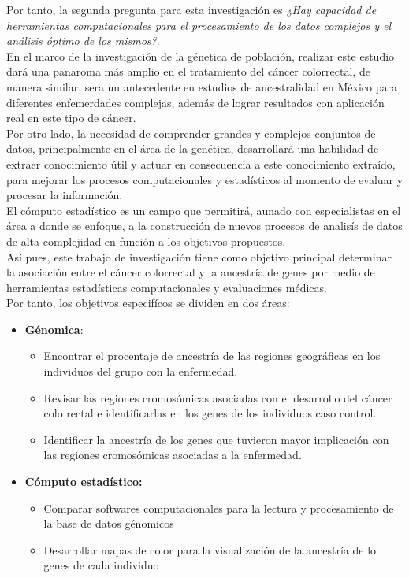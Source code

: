 
Por tanto, la segunda pregunta para esta investigación es \textit{¿Hay capacidad de herramientas computacionales para el procesamiento de los datos complejos y el análisis óptimo de los mismos?}.\\

En el marco de la investigación de la génetica de población, realizar este estudio dará una panaroma m\'as amplio en el tratamiento del cáncer colorrectal, de manera similar, sera un antecedente en estudios de ancestralidad en México para diferentes enfemerdades complejas, además de lograr resultados con aplicación real en este tipo de cáncer.\\

Por otro lado, la necesidad de comprender grandes y complejos conjuntos de datos, principalmente en el área de la gen\'etica, desarrollará una habilidad de extraer conocimiento útil y actuar en consecuencia a este conocimiento extraído, para mejorar los procesos computacionales y estadísticos al momento de evaluar y procesar la información.\\

El cómputo estadístico es un campo que permitirá, aunado con especialistas en el área a donde se enfoque, a la construcción de nuevos procesos de analisís de datos de alta complejidad en función a los objetivos propuestos.\\

Así pues, este trabajo de investigaci\'on tiene como objetivo principal determinar la asociación entre el c\'ancer colorrectal y la ancestr\'ia de genes por medio de herramientas estad\'isticas computacionales y evaluaciones m\'edicas.\\

Por tanto, los objetivos especifícos se dividen en dos \'areas:\\

\begin{itemize}
\item \textbf{Génomica}:
  \begin{itemize}
  \item Encontrar el procentaje de ancestr\'ia de las regiones geogr\'aficas en los individuos del grupo con la enfermedad.
  \item Revisar las regiones cromos\'omicas asociadas con el desarrollo del cáncer colo rectal e identificarlas en los genes de los individuos caso control.
  \item Identificar la ancestr\'ia de los genes que tuvieron mayor implicación con las regiones cromos\'omicas asociadas a la enfermedad.
  \end{itemize}
\item \textbf{Cómputo estadístico:}
  \begin{itemize}
  \item Comparar softwares computacionales para la lectura y procesamiento de la base de datos génomicos
  \item Desarrollar mapas de color para la visualización de la ancestr\'ia de lo genes de cada individuo
  \end{itemize}
\end{itemize}%

